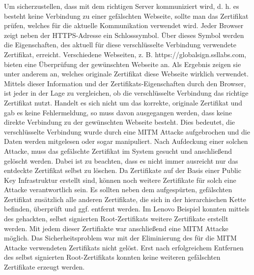 Um sicherzustellen, dass mit dem richtigen Server kommuniziert wird, d. h. es besteht keine Verbindung zu einer gefälschten Webseite, sollte man das Zertifikat prüfen, welches für die aktuelle Kommunikation verwendet wird. Jeder Browser zeigt neben der HTTPS-Adresse ein Schlosssymbol. Über dieses Symbol werden die Eigenschaften, des aktuell für diese verschlüsselte Verbindung verwendete Zertifikat, erreicht. Verschiedene Webseiten, z. B. https://globalsign.ssllabs.com, bieten eine Überprüfung der gewünschten Webseite an. Als Ergebnis zeigen sie unter anderem an, welches originale Zertifikat diese Webseite wirklich verwendet. Mittels dieser Information und der Zertifikats-Eigenschaften durch den Browser, ist jeder in der Lage zu vergleichen, ob die verschlüsselte Verbindung das richtige Zertifikat nutzt. Handelt es sich nicht um das korrekte, originale Zertifikat und gab es keine Fehlermeldung, so muss davon ausgegangen werden, dass keine direkte Verbindung zu der gewünschten Webseite besteht. Dies bedeutet, die verschlüsselte Verbindung wurde durch eine MITM Attacke aufgebrochen und die Daten werden mitgelesen oder sogar manipuliert. Nach Aufdeckung einer solchen Attacke, muss das gefälschte Zertifikat im System gesucht und anschließend gelöscht werden. Dabei ist zu beachten, dass es nicht immer ausreicht nur das entdeckte Zertifikat selbst zu löschen. Da Zertifikate auf der Basis einer Public Key Infrastruktur erstellt sind, können noch weitere Zertifikate für solch eine Attacke verantwortlich sein. Es sollten neben dem aufgespürten, gefälschten Zertifikat zusätzlich alle anderen Zertifikate, die sich in der hierarchischen Kette befinden, überprüft und ggf. entfernt werden. Im Lenovo Beispiel konnten mittels des gehackten, selbst signierten Root-Zertifikats weitere Zertifikate erstellt werden. Mit jedem dieser Zertifiakte war anschließend eine MITM Attacke möglich. Das Sicherheitsproblem war mit der Eliminierung des für die MITM Attacke verwendeten Zertifikats nicht gelöst. Erst nach erfolgreichem Entfernen des selbst signierten Root-Zertifikats konnten keine weiteren gefälschten Zertifikate erzeugt werden.
